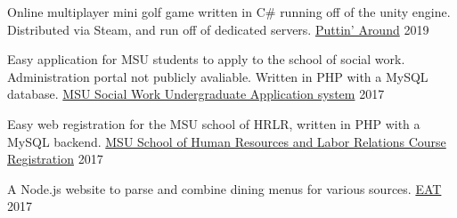 
\begin{cventries}
  \cventry
    {Online multiplayer mini golf game written in C\# running off of the unity engine. Distributed via Steam,
    and run off of dedicated servers.}
    {\href{https://store.steampowered.com/app/1002650/Puttin_Around/}{Puttin' Around}}
    {}
    {2019}
    {
    }

    \cventry
    {Easy application for MSU students to apply to the school of social work. Administration portal not publicly avaliable.
    Written in PHP with a MySQL database.}
    {\href{https://swdb.socialwork.msu.edu/basw/}{MSU Social Work Undergraduate Application system}}
    {}
    {2017}
    {
    }

    \cventry
    {Easy web registration for the MSU school of HRLR, written in PHP with a MySQL backend. }
    {\href{https://hrlr.msu.edu/registration/login.php}{MSU School of Human Resources and Labor Relations Course Registration}}
    {}
    {2017}
    {
    }

  \cventry
    {A Node.js website to parse and combine dining menus for various sources.}
    {\href{https://github.com/oonis/eat}{EAT}}
    {}
    {2017}
    {
    }



\end{cventries}
